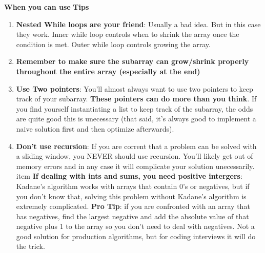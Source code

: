 \documentclass[12pt]{article}
\begin{document}
\textbf{When you can use}
\textbf{Tips}
\begin{enumerate}
\item \textbf{Nested While loops are your friend}: Usually a bad idea. But in this case they work. Inner while loop controls when to shrink the array once the condition is met. Outer while loop controls growing the array. 
\item \textbf{Remember to make sure the subarray can grow/shrink properly throughout the entire array (especially at the end)}
\item \textbf{Use Two pointers}: You'll almost always want to use two pointers to keep track of your subarray. \textbf{These pointers can do more than you think}. If you find yourself instantiating a list to keep track of the subarray, the odds are quite good this is unecessary (that said, it's always good to implement a naive solution first and then optimize afterwards).
\item \textbf{Don't use recursion}: If you are corrent that a problem can be solved with a sliding window, you NEVER should use recursion. You'll likely get out of memory errors and in any case it will complicate your solution unecessarily. 
item \textbf{If dealing with ints and sums, you need positive intergers}: Kadane's algorithm works with arrays that contain 0's or negatives, but if you don't know that, solving this problem without Kadane's algorithm is extremely complicated. \textbf{Pro Tip}: if you are confronted with an array that has negatives, find the largest negative and add the absolute value of that negative plus 1 to the array so you don't need to deal with negatives. Not a good solution for production algorithms, but for coding interviews it will do the trick. 
\end{enumerate}
\end{document}
